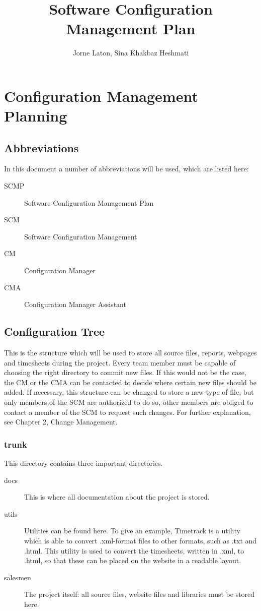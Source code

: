 \documentclass{report}
\author{Jorne Laton, Sina Khakbaz Heshmati}
\title{Software Configuration Management Plan}
\begin{document}
\chapter{Configuration Management Planning}
\section{Abbreviations}
In this document a number of abbreviations will be used, which are listed here:
\begin{description}
\item[SCMP]
Software Configuration Management Plan
\item[SCM]
Software Configuration Management
\item[CM]
Configuration Manager
\item[CMA]
Configuration Manager Assistant
\end{description}
\section{Configuration Tree}
This is the structure which will be used to store all source files, reports, webpages and timesheets during the project.
Every team member must be capable of choosing the right directory to commit new files.
If this would not be the case, the CM or the CMA can be contacted to decide where certain new files should be added.
If necessary, this structure can be changed to store a new type of file, but only members of the SCM are authorized to do so, other members are obliged to contact a member of the SCM to request such changes.
For further explanation, see Chapter 2, Change Management.
\subsection{trunk}
This directory contains three important directories.
\begin{description}
\item[docs]
This is where all documentation about the project is stored.
\item[utils]
Utilities can be found here.
To give an example, Timetrack is a utility which is able to convert .xml-format files to other formats, such as .txt and .html.
This utility is used to convert the timesheets, written in .xml, to .html, so that these can be placed on the website in a readable layout.
\item[salesmen]
The project itself: all source files, website files and libraries must be stored here.
\end{description}
\end{document}
